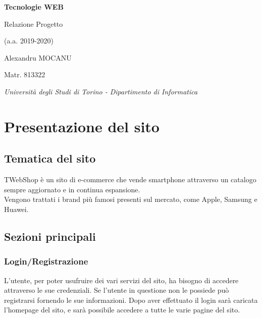 \documentclass[14pt]{extarticle}
\begin{document}
\begin{titlepage}
\centering
{\LARGE\bfseries Tecnologie WEB}

\vspace{1cm}

{\Large Relazione Progetto}

\vspace{0.2cm}
{\large (a.a. 2019-2020)}

\vspace{2cm}

{\large Alexandru MOCANU}

\vspace{0.2cm}

{\small Matr. 813322}


\vspace{2cm}


\vfill

{\itshape Università degli Studi di Torino - Dipartimento di Informatica}
\end{titlepage}

\tableofcontents

\clearpage

\section{Presentazione del sito}
\subsection{Tematica del sito}
TWebShop è un sito di e-commerce che vende smartphone attraverso un catalogo sempre
aggiornato e in continua espansione.
\\
Vengono trattati i brand più famosi presenti sul mercato, come Apple, Samsung e Huawei.

\subsection{Sezioni principali}
\subsubsection{Login/Registrazione}
L'utente, per poter usufruire dei vari servizi del sito, ha bisogno di
accedere attraverso le sue credenziali. Se l'utente in questione non le possiede può registrarsi
fornendo le sue informazioni. Dopo aver effettuato il login sarà caricata l'homepage del sito, e
sarà possibile accedere a tutte le varie pagine del sito.
\end{document}

